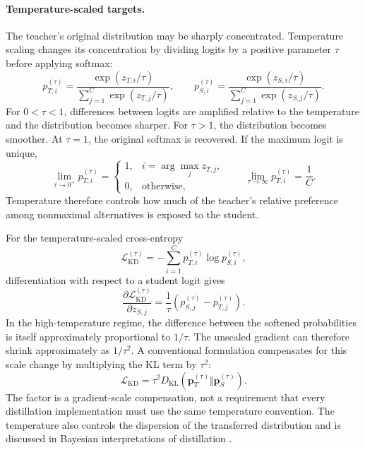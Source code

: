 \paragraph{Temperature-scaled targets.}
The teacher's original distribution may be sharply concentrated.  Temperature
scaling changes its concentration by dividing logits by a positive parameter
\(\tau\) before applying softmax:
\begin{equation}
    p_{T,i}^{(\tau)}
    =\frac{\exp(z_{T,i}/\tau)}
    {\displaystyle\sum_{j=1}^{C}\exp(z_{T,j}/\tau)},
    \qquad
    p_{S,i}^{(\tau)}
    =\frac{\exp(z_{S,i}/\tau)}
    {\displaystyle\sum_{j=1}^{C}\exp(z_{S,j}/\tau)}.
    \label{eq:distillation-temperature-softmax}
\end{equation}
For \(0<\tau<1\), differences between logits are amplified relative to
the temperature and the distribution becomes sharper.  For \(\tau>1\),
the distribution becomes smoother.  At \(\tau=1\), the original softmax
is recovered.  If the maximum logit is unique,
\begin{equation}
    \lim_{\tau\to 0^+}p_{T,i}^{(\tau)}
    =\begin{cases}
        1,&i=\arg\max_j z_{T,j},\\
        0,&\text{otherwise},
    \end{cases}
    \qquad
    \lim_{\tau\to\infty}p_{T,i}^{(\tau)}=\frac{1}{C}.
    \label{eq:distillation-temperature-limits}
\end{equation}
Temperature therefore controls how much of the teacher's relative preference
among nonmaximal alternatives is exposed to the student.

For the temperature-scaled cross-entropy
\begin{equation}
    \mathcal L_{\mathrm{KD}}^{(\tau)}
    =-\sum_{i=1}^{C}p_{T,i}^{(\tau)}
    \log p_{S,i}^{(\tau)},
    \label{eq:distillation-temperature-ce}
\end{equation}
differentiation with respect to a student logit gives
\begin{equation}
    \frac{\partial\mathcal L_{\mathrm{KD}}^{(\tau)}}
    {\partial z_{S,j}}
    =\frac{1}{\tau}
    \left(p_{S,j}^{(\tau)}-p_{T,j}^{(\tau)}\right).
    \label{eq:distillation-temperature-gradient}
\end{equation}
In the high-temperature regime, the difference between the softened
probabilities is itself approximately proportional to \(1/\tau\).  The
unscaled gradient can therefore shrink approximately as \(1/\tau^2\).
A conventional formulation compensates for this scale change by multiplying
the KL term by \(\tau^2\):
\begin{equation}
    \mathcal L_{\mathrm{KD}}
    =\tau^2D_{\mathrm{KL}}
    \left(\mathbf p_T^{(\tau)}\Vert
    \mathbf p_S^{(\tau)}\right).
    \label{eq:distillation-temperature-scaled-kl}
\end{equation}
The factor is a gradient-scale compensation, not a requirement that every
distillation implementation must use the same temperature convention.  The
temperature also controls the dispersion of the transferred distribution and
is discussed in Bayesian interpretations of distillation
\parencite{Fang2026KnowledgeDatasetDistillation,Yang2024SurveyKD}.

